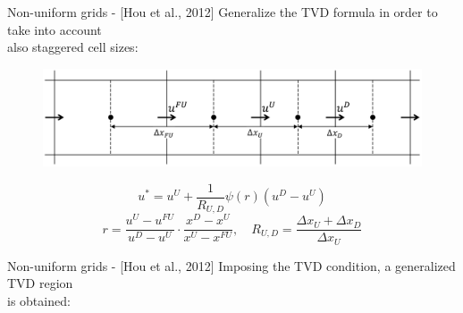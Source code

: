 \documentclass{beamer}
\begin{document}
\begin{frame}{Non-uniform grids - [Hou et al., 2012]}
Generalize the TVD formula in order to take into account\\
also staggered cell 
sizes:
\begin{figure}
	\centering
	\includegraphics[width=\textwidth]{cells_with_sizes.pdf}
\end{figure}
\begin{equation*}
	u^* = u^U + \frac{1}{R_{U,D}} \psi(r)(u^D-u^U)
\end{equation*}
\begin{equation*}
		r = \frac{u^U-u^{FU}}{u^D-u^U}\cdot\frac{x^D-x^U}{x^U-x^{FU}}, \quad 
		R_{U,D} 
		= \frac{\Delta x_U + \Delta x_D}{\Delta x_U}
\end{equation*}
\end{frame}
\begin{frame}{Non-uniform grids - [Hou et al., 2012]}
Imposing the TVD condition, a generalized TVD region\\is obtained:
\begin{figure}
	\centering
	\hspace{-1.5cm}
	
\end{figure}
\end{frame}
\end{document}
